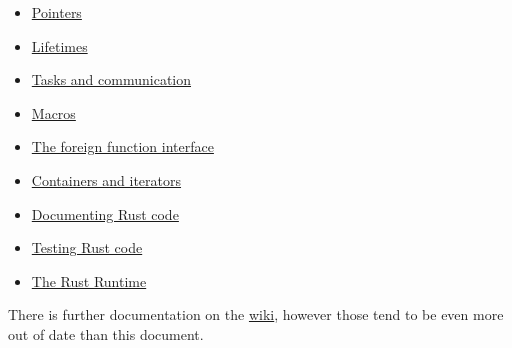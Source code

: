 \documentclass[]{article}
\begin{document}
\begin{itemize}
\itemsep1pt\parskip0pt
\item
  \href{guide-pointers.html}{Pointers}
\item
  \href{guide-lifetimes.html}{Lifetimes}
\item
  \href{guide-tasks.html}{Tasks and communication}
\item
  \href{guide-macros.html}{Macros}
\item
  \href{guide-ffi.html}{The foreign function interface}
\item
  \href{guide-container.html}{Containers and iterators}
\item
  \href{rustdoc.html}{Documenting Rust code}
\item
  \href{guide-testing.html}{Testing Rust code}
\item
  \href{guide-runtime.html}{The Rust Runtime}
\end{itemize}

There is further documentation on the
\href{https://github.com/rust-lang/rust/wiki/Docs}{wiki}, however those
tend to be even more out of date than this document.
\end{document}

